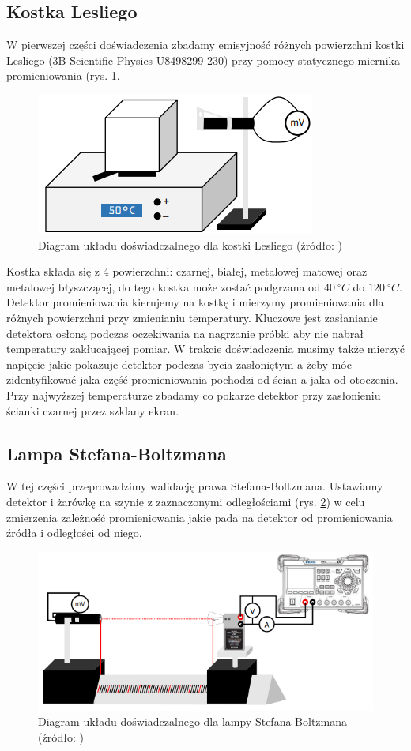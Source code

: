 \documentclass[12pt]{article}
\begin{document}
\subsection{Kostka Lesliego}
W pierwszej części doświadczenia zbadamy emisyjność różnych powierzchni kostki Lesliego (3B Scientific Physics U8498299-230) przy pomocy statycznego miernika promieniowania (rys. \ref{fig:cube_diagram}. 
\begin{figure}[H]
    \centering
    \includegraphics[scale=0.5]{cube}
    \caption{Diagram układu doświadczalnego dla kostki Lesliego (źródło: \cite{skrypt})}
    \label{fig:cube_diagram}
\end{figure}
Kostka składa się z 4 powierzchni: czarnej, białej, metalowej matowej oraz metalowej błyszczącej, do tego kostka może zostać podgrzana od $40 \ ^{\circ}C$ do $120 \ ^{\circ}C$.
Detektor promieniowania kierujemy na kostkę i mierzymy promieniowania dla różnych powierzchni przy zmienianiu temperatury. 
Kluczowe jest zasłanianie detektora osłoną podczas oczekiwania na nagrzanie próbki aby nie nabrał temperatury zakłucającej pomiar.
W trakcie doświadczenia musimy także mierzyć napięcie jakie pokazuje detektor podczas bycia zasłoniętym a żeby móc zidentyfikować jaka część promieniowania pochodzi od ścian a jaka od otoczenia.
Przy najwyższej temperaturze zbadamy co pokarze detektor przy zasłonieniu ścianki czarnej przez szklany ekran.

\subsection{Lampa Stefana-Boltzmana}
W tej części przeprowadzimy walidację prawa Stefana-Boltzmana. Ustawiamy detektor i żarówkę na szynie z zaznaczonymi odległościami (rys. \ref{fig:lamp_diagram}) w celu zmierzenia zależność promieniowania jakie pada na detektor od promieniowania źródła i odległości od niego.

\begin{figure}[H]
    \centering
    \includegraphics[scale=0.5]{lamp}
    \caption{Diagram układu doświadczalnego dla lampy Stefana-Boltzmana (źródło: \cite{skrypt})}
    \label{fig:lamp_diagram}
\end{figure}
\end{document}
